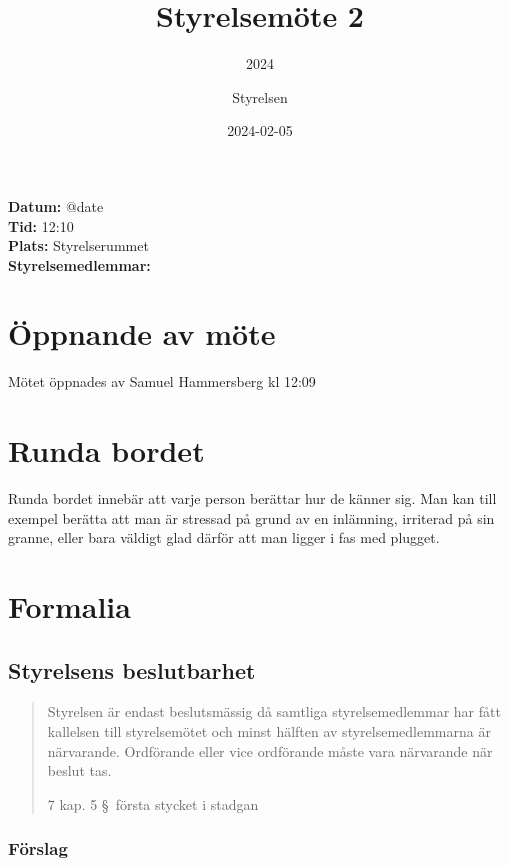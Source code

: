 \documentclass[protokoll]{dvd}
\begin{document}
\title{Styrelsemöte 2}
\subtitle{2024}
\author{Styrelsen}
\date{2024-02-05}


\textbf{Datum:} \csname @date\endcsname\\
\textbf{Tid:} 12:10\\
\textbf{Plats:} Styrelserummet\\
\textbf{Styrelsemedlemmar:}
\begin{närvarande_förtroendevalda}
\end{närvarande_förtroendevalda}

\section{Öppnande av möte}

Mötet öppnades av Samuel Hammersberg kl 12:09

\section{Runda bordet}

Runda bordet innebär att varje person berättar hur de känner sig.
Man kan till exempel berätta att man är stressad på grund av en inlämning, irriterad på sin granne, eller bara väldigt glad därför att man ligger i fas med plugget.

\section{Formalia}

\subsection{Styrelsens beslutbarhet}

\blockquote[7 kap. 5 \S~första stycket i stadgan][]{%
    Styrelsen är endast beslutsmässig då samtliga styrelsemedlemmar har fått kallelsen till styrelsemötet och minst hälften av styrelsemedlemmarna är närvarande.
    Ordförande eller vice ordförande måste vara närvarande när beslut tas.
}

\subsubsection*{Förslag}
\end{document}
